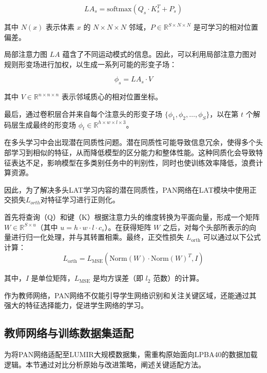 \begin{equation}
    LA_s = \text{softmax}\left(Q_s \cdot K_s^T + P_s\right)
\end{equation}

其中 \( N(x) \) 表示体素 \( x \) 的 \( N \times N \times N \) 邻域，\( P \in \mathbb{R}^{S \times N \times N} \) 是可学习的相对位置偏差。

局部注意力图 \( LA \) 蕴含了不同运动模式的信息。因此，可以利用局部注意力图对规则形变场进行加权，以生成一系列可能的形变子场：

\begin{equation}
    \phi_s = LA_s \cdot V
\end{equation}

其中 \( V \in \mathbb{R}^{n \times n \times n} \) 表示邻域质心的相对位置坐标。

最后，通过卷积层合并来自每个注意头的形变子场 \( \{ \phi_1, \phi_2, \ldots, \phi_S \} \)，以在第 \( t \) 个解码层生成最终的形变场 \( \phi_t \in \mathbb{R}^{h \times w \times l \times 3} \)。

在多头学习中会出现潜在同质性问题。潜在同质性可能导致信息冗余，使得多个头部学习到相似的特征，从而降低模型的区分能力和整体性能。这种同质化会导致特征表达不足，影响模型在多类别任务中的判别性，同时也使训练效率降低，浪费计算资源。

因此，为了解决多头LAT学习内容的潜在同质性，PAN网络在LAT模块中使用正交损失$L_{orth}$对特征学习进行正则化\cite{brock2016neural}。

首先将查询（Q）和键（K）根据注意力头的维度转换为平面向量，形成一个矩阵 \( W \in \mathbb{R}^{S \times u} \)（其中 \( u = h \cdot w \cdot l \cdot c_s \)）。在获得矩阵 \( W \) 之后，对每个头部所表示的向量进行归一化处理，并与其转置相乘。最终，正交性损失 \( L_{\text{orth}} \) 可以通过以下公式计算：
\begin{equation}
    L_{\text{orth}} = L_{\text{MSE}}\left(\text{Norm}(W) \cdot \text{Norm}(W)^T, I\right)
\end{equation}

其中，\( I \) 是单位矩阵，\( L_{\text{MSE}} \) 是均方误差（即 \( l_2 \) 范数）的计算。

作为教师网络，PAN网络不仅能引导学生网络识别和关注关键区域，还能通过其强大的特征选择能力，促进学生网络的学习。

\subsection{教师网络与训练数据集适配}

为将PAN网络适配至LUMIR大规模数据集，需重构原始面向LPBA40的数据加载逻辑。本节通过对比分析原始与改进策略，阐述关键适配方法。


